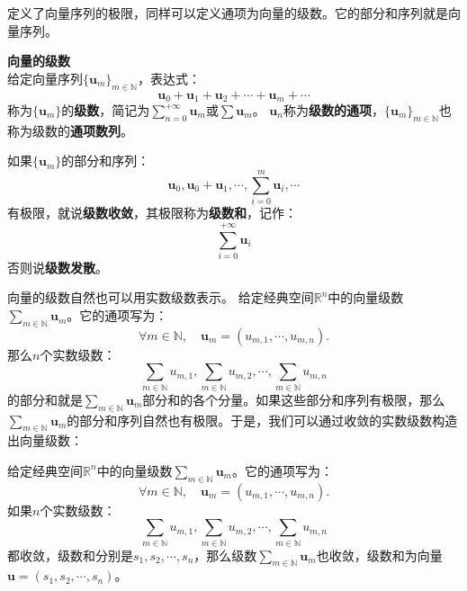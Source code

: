 \documentclass[12pt,UTF8,fontset=none]{ctexbook}
\begin{document}
定义了向量序列的极限，同样可以定义通项为向量的级数。它的部分和序列就是向量序列。
\begin{df}{\textbf{向量的级数}}
    \mbox{} \\
    给定向量序列$\{\mathbf{u}_m\}_{m\in\mathbb{N}}$，表达式：
    $$ \mathbf{u}_0 + \mathbf{u}_1 + \mathbf{u}_2 + \cdots + \mathbf{u}_m + \cdots $$
    称为$\{\mathbf{u}_m\}$的\textbf{级数}，简记为$\sum_{n=0}^{+\infty} \mathbf{u}_m$或$\sum \mathbf{u}_m$。
    $\mathbf{u}_n$称为\textbf{级数的通项}，$\{\mathbf{u}_m\}_{m\in\mathbb{N}}$也称为级数的\textbf{通项数列}。
    
    如果$\{\mathbf{u}_m\}$的部分和序列：
    $$ \mathbf{u}_0, \mathbf{u}_0 + \mathbf{u}_1, \cdots , \sum_{i=0}^m \mathbf{u}_i, \cdots $$
    有极限，就说\textbf{级数收敛}，其极限称为\textbf{级数和}，记作：
    $$ \sum_{i=0}^{+\infty} \mathbf{u}_i $$
    否则说\textbf{级数发散}。
    
\end{df}

向量的级数自然也可以用实数级数表示。
给定经典空间$\mathbb{R}^n$中的向量级数$\sum_{m\in\mathbb{N}} \mathbf{u}_m$。它的通项写为：
$$ \forall m\in\mathbb{N}, \quad \mathbf{u}_m = (u_{m,1}, \cdots, u_{m,n}).$$
那么$n$个实数级数：
$$ \sum_{m\in\mathbb{N}} u_{m,1}, \sum_{m\in\mathbb{N}} u_{m,2}, \cdots , \sum_{m\in\mathbb{N}} u_{m,n} $$
的部分和就是$\sum_{m\in\mathbb{N}} \mathbf{u}_m$部分和的各个分量。如果这些部分和序列有极限，那么$\sum_{m\in\mathbb{N}} \mathbf{u}_m$的部分和序列自然也有极限。于是，我们可以通过收敛的实数级数构造出向量级数：
\begin{tm}
    给定经典空间$\mathbb{R}^n$中的向量级数$\sum_{m\in\mathbb{N}} \mathbf{u}_m$。它的通项写为：
    $$ \forall m\in\mathbb{N}, \quad \mathbf{u}_m = (u_{m,1}, \cdots, u_{m,n}).$$
    如果$n$个实数级数：
    $$ \sum_{m\in\mathbb{N}} u_{m,1}, \sum_{m\in\mathbb{N}} u_{m,2}, \cdots , \sum_{m\in\mathbb{N}} u_{m,n} $$
    都收敛，级数和分别是$s_1, s_2, \cdots, s_n$，那么级数$\sum_{m\in\mathbb{N}} \mathbf{u}_m$也收敛，级数和为向量$\mathbf{u} = (s_1, s_2, \cdots, s_n)$。
\end{tm}
\end{document}
